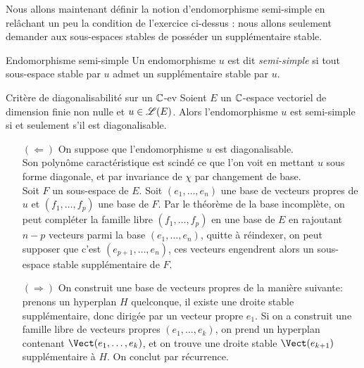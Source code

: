 Nous allons maintenant définir la notion d'endomorphisme semi-simple en relâchant un peu la
condition de l'exercice ci-dessus : nous allons seulement demander aux sous-espaces stables de posséder
un supplémentaire stable.

\begin{defi}{Endomorphisme semi-simple}
    Un endomorphisme $u$ est dit \emph{semi-simple} si tout sous-espace stable par $u$ admet un supplémentaire stable par $u$.
\end{defi}

\begin{prop}{Critère de diagonalisabilité sur un $\mathbb{C}$-ev}
    Soient $E$ un $\mathbb{C}$-espace vectoriel de dimension finie non nulle et $u \in \mathscr{L}(E)$. Alors l'endomorphisme $u$ est semi-simple si et seulement s'il est diagonalisable.
\end{prop}

\begin{preuve}
    \begin{itemize}
        \item[$(\Leftarrow)$] On suppose que l'endomorphisme $u$ est diagonalisable. \\
        Son polynôme caractéristique est scindé ce que l'on voit en mettant $u$ sous forme diagonale, et par invariance de $\chi$ par changement de base. \\
        Soit $F$ un sous-espace de $E$. Soit $(e_1, \dots, e_n)$ une base de vecteurs propres de $u$ et $(f_1, \dots, f_p)$ une base de $F$. Par le théorème de la base incomplète, on peut compléter la famille libre $(f_1, \dots, f_p)$ en une base de $E$ en rajoutant $n-p$ vecteurs parmi la base $(e_1, \dots, e_n)$, quitte à réindexer, on peut supposer que c'est $(e_{p+1}, \dots, e_n)$, ces vecteurs engendrent alors un sous-espace stable supplémentaire de $F$.
        \item[$(\Rightarrow)$] On construit une base de vecteurs propres de la manière suivante: prenons un hyperplan $H$ quelconque, il existe une droite stable supplémentaire, donc dirigée par un vecteur propre $e_1$. Si on a construit une famille libre de vecteurs propres $(e_1, \dots, e_k)$, on prend un hyperplan contenant $\Vect(e_1, \dots, e_k)$, et on trouve une droite stable $\Vect(e_{k+1})$ supplémentaire à $H$. On conclut par récurrence.
    \end{itemize}
\end{preuve}

